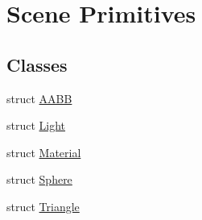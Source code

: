 \hypertarget{group__g11}{}\section{Scene Primitives}
\label{group__g11}
\subsection*{Classes}
\begin{DoxyCompactItemize}
\item 
struct \hyperlink{struct_a_a_b_b}{A\+A\+BB}
\item 
struct \hyperlink{struct_light}{Light}
\item 
struct \hyperlink{struct_material}{Material}
\item 
struct \hyperlink{struct_sphere}{Sphere}
\item 
struct \hyperlink{struct_triangle}{Triangle}
\end{DoxyCompactItemize}

